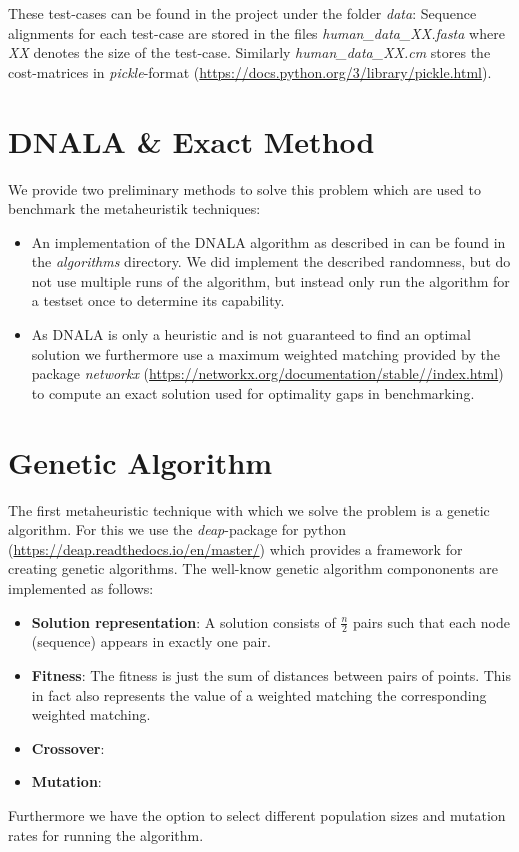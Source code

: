\documentclass[12pt]{article}
\begin{document}
These test-cases can be found in the project under the folder \textit{data}:
Sequence alignments for each test-case are stored in the files \textit{human\_data\_XX.fasta} where \textit{XX} denotes the size of the test-case.
Similarly \textit{human\_data\_XX.cm} stores the cost-matrices in \textit{pickle}-format (\url{https://docs.python.org/3/library/pickle.html}).

\section{DNALA \& Exact Method}
We provide two preliminary methods to solve this problem which are used to benchmark the metaheuristik techniques:
\begin{itemize}
    \item An implementation of the DNALA algorithm as described in \cite{mainpaper} can be found in the \textit{algorithms} directory.
    We did implement the described randomness, but do not use multiple runs of the algorithm, but instead only run the algorithm for a testset once to determine its capability.

    \item As DNALA is only a heuristic and is not guaranteed to find an optimal solution we furthermore use a maximum weighted matching provided by the package \textit{networkx} (\url{https://networkx.org/documentation/stable//index.html}) to compute an exact solution used for optimality gaps in benchmarking.
\end{itemize}

\section{Genetic Algorithm}
The first metaheuristic technique with which we solve the problem is a genetic algorithm.
For this we use the \textit{deap}-package for python (\url{https://deap.readthedocs.io/en/master/}) which provides a framework for creating genetic algorithms.
The well-know genetic algorithm compononents are implemented as follows:
\begin{itemize}
    \item \textbf{Solution representation}: A solution consists of $\frac{n}{2}$ pairs such that each node (sequence) appears in exactly one pair.
    \item \textbf{Fitness}: The fitness is just the sum of distances between pairs of points. 
    This in fact also represents the value of a weighted matching the corresponding weighted matching.
    \item \textbf{Crossover}:
    \item \textbf{Mutation}:
\end{itemize}
Furthermore we have the option to select different population sizes and mutation rates for running the algorithm.
\end{document}
